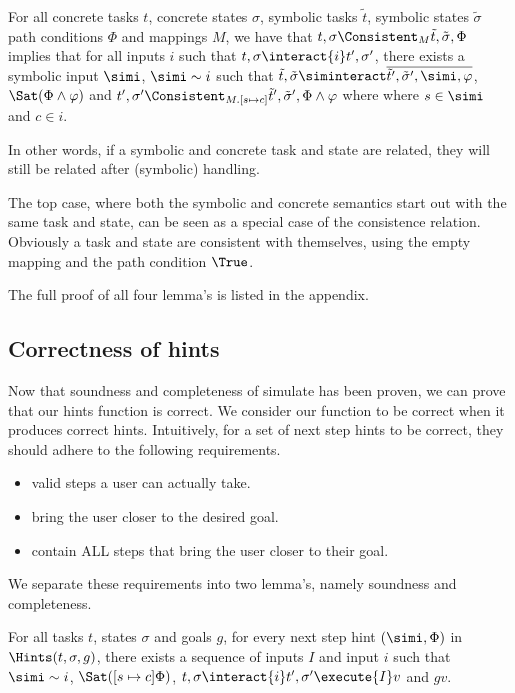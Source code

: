 \begin{lemma}
  \label{lem:completedriving}
  For all concrete tasks $t$, concrete states $\sigma$, symbolic tasks $\tilde{t}$, symbolic states $\tilde{\sigma}$ path conditions $\Phi$ and mappings $M$,
  we have that $t,\sigma\Consistent_{M}\tilde{t},\tilde{\sigma},\Phi$ implies
  that for all inputs $i$ such that $t,\sigma\interact{i}t',\sigma'$,
  there exists a symbolic input $\simi$, $\simi\sim i$ such that
  $\tilde{t},\tilde{\sigma}\siminteract\overline{\tilde{t}',\tilde{\sigma}',\simi,\phi}$, $\Sat(\Phi\land\phi)$ and $t',\sigma'\Consistent_{M.[s\mapsto c]}\tilde{t}',\tilde{\sigma}',\Phi\land\phi$ where where $s\in\simi$ and $c\in i$.
\end{lemma}

In other words, if a symbolic and concrete task and state are related, they will still be related after (symbolic) handling.

The top case, where both the symbolic and concrete semantics start out with the same task and state, can be seen as a special case of the consistence relation.
Obviously a task and state are consistent with themselves, using the empty mapping and the path condition $\True$.

The full proof of all four lemma's is listed in the appendix.


\subsection{Correctness of hints}

Now that soundness and completeness of simulate has been proven, we can prove that our hints function is correct.
We consider our function to be correct when it produces correct hints.
Intuitively, for a set of next step hints to be correct, they should adhere to the following requirements.

\begin{itemize}
  \item valid steps a user can actually take.
  \item bring the user closer to the desired goal.
  \item contain ALL steps that bring the user closer to their goal.
\end{itemize}

We separate these requirements into two lemma's, namely soundness and completeness.

\begin{theorem}
  \label{thm:soundhint}

For all tasks $t$, states $\sigma$ and goals $g$,
for every next step hint $(\simi,\Phi)$ in $\Hints(t,\sigma,g)$,
there exists a sequence of inputs $I$ and input $i$ such that $\simi\sim i$,
$\Sat([s\mapsto c]\Phi)$, $t,\sigma\interact{i} t',\sigma'\execute{I} v$ and $gv$.
\end{theorem}

